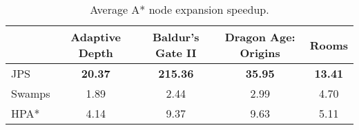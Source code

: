 \begin{table}[tb]
\begin{center}
\begin{tabular}{lcccc}
  \hline
 & Adaptive Depth & Baldur's Gate II & Dragon Age: Origins & Rooms \\ 
  \hline
JPS & \textbf{20.37} & \textbf{215.36} & \textbf{35.95} & \textbf{13.41} \\ 
  Swamps & 1.89 & 2.44 & 2.99 & 4.70 \\ 
  HPA* & 4.14 & 9.37 & 9.63 & 5.11 \\ 
   \hline
\end{tabular}
\end{center}
\caption{Average A* node expansion speedup.} 
\label{table::jps::nodes}
\end{table}


